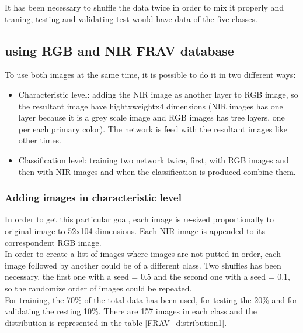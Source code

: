 It has been necessary to shuffle the data twice in order to mix it properly and traning, testing and validating test would have data of the five classes.\\

\subsection{using RGB and NIR FRAV database}
To use both images at the same time, it is possible to do it in two different ways:
\begin{itemize}
\item Characteristic level: adding the NIR image as another layer to RGB image, so the resultant image have hightxweightx4 dimensions (NIR images has one layer because it is a grey scale image and RGB images has tree layers, one per each primary color). The network is feed with the resultant images like other times.
\item Classification level: training two network twice, first, with RGB images and then with NIR images and when the classification is produced combine them.
\end{itemize}


\subsubsection{Adding images in characteristic level}
In order to get this particular goal, each image is re-sized proportionally to original image to 52x104 dimensions. Each NIR image is appended to its correspondent RGB image.\\

In order to create a list of images where images are not putted in order, each image followed by another could be of a different class. Two shuffles has been necessary, the first one with a seed = 0.5 and the second one with a seed = 0.1, so the randomize order of images could be repeated.\\

For training, the 70\% of the total data has been used, for testing the 20\% and for validating the resting 10\%. There are 157 images in each class and the distribution is represented in the table \ref{FRAV_distribution1}.\\

